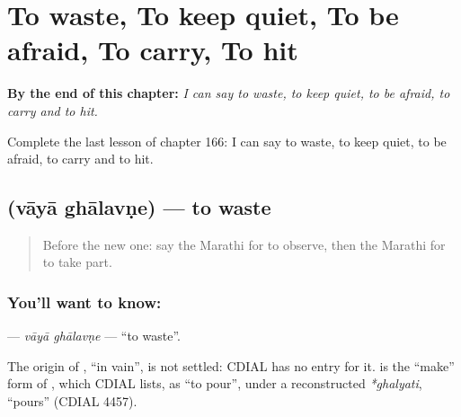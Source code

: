 
\chapter{To waste, To keep quiet, To be afraid, To carry, To hit}
\label{ch:mr-to-waste-to-keep-quiet-to-be-afraid-to-carry-to-hit}

\begin{chapteropening}
\textbf{By the end of this chapter:} \emph{I can say to waste, to keep quiet, to be afraid, to carry and to hit.}

Complete the last lesson of chapter 166: I can say to waste, to keep quiet, to be afraid, to carry and to hit.
\end{chapteropening}

\section[\texorpdfstring{\mr{वाया} \mr{घालवणे} (vāyā ghālavṇe)}{वाया घालवणे (vāyā ghālavṇe)}]{  (vāyā ghālavṇe) — to waste}

\label{lesson:MR-C166-vaya-ghalavne}



\begin{quote}
Before the new one: say the Marathi for to observe, then the Marathi for to take part.
\end{quote}

\subsection*{You'll want to know:  }
\textbf{ } — \emph{vāyā ghālavṇe} — \textquotedblleft{}to waste\textquotedblright{}.

\begin{cousinweb}
The origin of \textbf{}, \textquotedblleft{}in vain\textquotedblright{}, is not settled: CDIAL has no entry for it. \textbf{} is the \textquotedblleft{}make\textquotedblright{} form of \textbf{}, which CDIAL lists, as \textquotedblleft{}to pour\textquotedblright{}, under a reconstructed \emph{*ghalyati}, \textquotedblleft{}pours\textquotedblright{} (CDIAL 4457).
\end{cousinweb}

